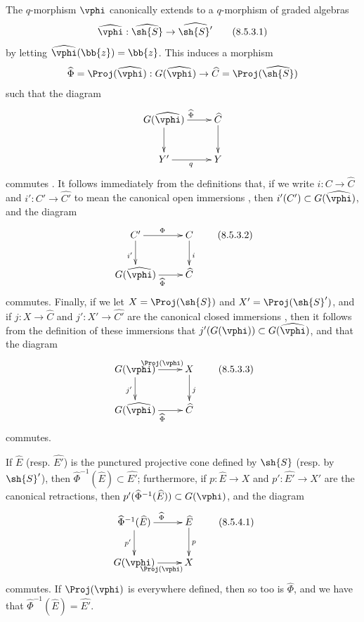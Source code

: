\begin{env}[8.5.3]
\label{II.8.5.3}
The $q$-morphism $\vphi$ canonically extends to a $q$-morphism of graded algebras
\[
\label{II.8.5.3.1}
  \widehat{\vphi}: \widehat{\sh{S}} \to \widehat{\sh{S}'}
\tag{8.5.3.1}
\]
by letting $\widehat{\vphi}(\bb{z})=\bb{z}$.
This induces a morphism
\[
  \widehat{\Phi} = \Proj(\widehat{\vphi}) : G(\widehat{\vphi}) \to \widehat{C} = \Proj(\widehat{\sh{S}})
\]
such that the diagram
\[
  \xymatrix{
    G(\widehat{\vphi})
      \ar[r]^{\widehat{\Phi}}
      \ar[d]
  & \widehat{C}
      \ar[d]
  \\Y'
      \ar[r]_{q}
  & Y
  }
\]
commutes .
It follows immediately from the definitions that, if we write $i:C\to\widehat{C}$ and $i':C'\to\widehat{C'}$ to mean the canonical open immersions , then $i'(C')\subset G(\widehat{\vphi})$, and the diagram
\[
\label{eq:2.8.5.3.2}
  \xymatrix{
    C'
      \ar[r]^{\Phi}
      \ar[d]_{i'}
  & C
      \ar[d]^{i}
  \\G(\widehat{\vphi})
      \ar[r]_{\widehat{\Phi}}
  & \widehat{C}
  }
\tag{8.5.3.2}
\]
commutes.
Finally, if we let $X=\Proj(\sh{S})$ and $X'=\Proj(\sh{S}')$, and if $j:X\to\widehat{C}$ and $j':X'\to\widehat{C'}$ are the canonical closed immersions , then it follows from the definition of these immersions that $j'(G(\vphi))\subset G(\widehat{\vphi})$, and that the diagram
\[
\label{II.8.5.3.3}
  \xymatrix{
    G(\vphi)
      \ar[r]^{\Proj(\vphi)}
      \ar[d]_{j'}
  & X
      \ar[d]^{j}
  \\G(\widehat{\vphi})
      \ar[r]_{\widehat{\Phi}}
  & \widehat{C}
  }
\tag{8.5.3.3}
\]
commutes.
\end{env}

\begin{proposition}[8.5.4]
\label{II.8.5.4}
If $\widehat{E}$ (resp. $\widehat{E'}$) is the punctured projective cone defined by $\sh{S}$ (resp. by $\sh{S}'$), then $\widehat{\Phi}^{-1}(\widehat{E}) \subset \widehat{E'}$;
furthermore, if $p:\widehat{E}\to X$ and $p':\widehat{E'}\to X'$ are the canonical retractions, then $p'(\widehat{\Phi}^{-1}(\widehat{E})) \subset G(\vphi)$, and the diagram
\[
\label{II.8.5.4.1}
  \xymatrix{
    \widehat{\Phi}^{-1}(\widehat{E})
      \ar[r]^{\widehat{\Phi}}
      \ar[d]_{p'}
  & \widehat{E}
      \ar[d]^{p}
  \\G(\vphi)
      \ar[r]_{\Proj(\vphi)}
  & X
  }
\tag{8.5.4.1}
\]
commutes.
If $\Proj(\vphi)$ is everywhere defined, then so too is $\widehat{\Phi}$, and we have that $\widehat{\Phi}^{-1}(\widehat{E}) = \widehat{E'}$.
\end{proposition}

